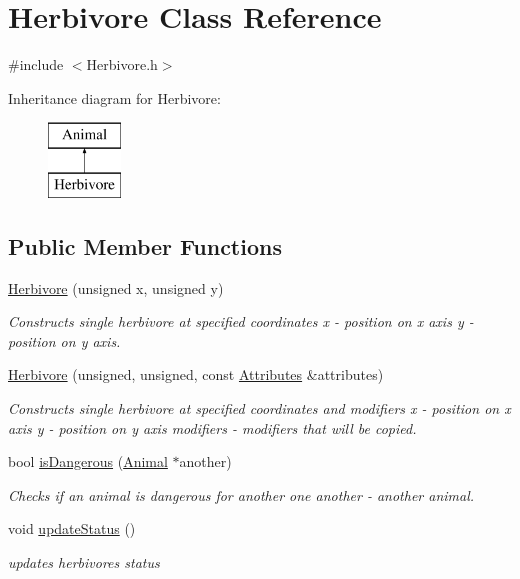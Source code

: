 \hypertarget{class_herbivore}{}\section{Herbivore Class Reference}
\label{class_herbivore}


{\ttfamily \#include $<$Herbivore.\+h$>$}

Inheritance diagram for Herbivore\+:\begin{figure}[H]
\begin{center}
\leavevmode
\includegraphics[height=2.000000cm]{class_herbivore}
\end{center}
\end{figure}
\subsection*{Public Member Functions}
\begin{DoxyCompactItemize}
\item 
\hyperlink{class_herbivore_a7fd69ef4659c97df525a04e54d5194be}{Herbivore} (unsigned x, unsigned y)
\begin{DoxyCompactList}\small\item\em Constructs single herbivore at specified coordinates  x -\/ position on x axis  y -\/ position on y axis. \end{DoxyCompactList}\item 
\hyperlink{class_herbivore_a2ff8de430287eda378edad800f9ec730}{Herbivore} (unsigned, unsigned, const \hyperlink{class_attributes}{Attributes} \&attributes)
\begin{DoxyCompactList}\small\item\em Constructs single herbivore at specified coordinates and modifiers  x -\/ position on x axis  y -\/ position on y axis  modifiers -\/ modifiers that will be copied. \end{DoxyCompactList}\item 
bool \hyperlink{class_herbivore_a330a480982c71b393d90a95ae9e7f513}{is\+Dangerous} (\hyperlink{class_animal}{Animal} $\ast$another)
\begin{DoxyCompactList}\small\item\em Checks if an animal is dangerous for another one  another -\/ another animal. \end{DoxyCompactList}\item 
void \hyperlink{class_herbivore_ab85ced8d71235be1cb475e01e097ba55}{update\+Status} ()
\begin{DoxyCompactList}\small\item\em updates herbivore\textquotesingle{}s status \end{DoxyCompactList}\end{DoxyCompactItemize}
